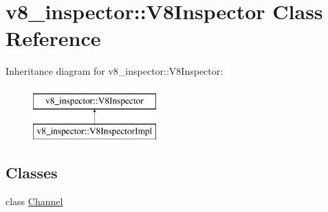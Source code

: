 \hypertarget{classv8__inspector_1_1V8Inspector}{}\section{v8\+\_\+inspector\+:\+:V8\+Inspector Class Reference}
\label{classv8__inspector_1_1V8Inspector}
Inheritance diagram for v8\+\_\+inspector\+:\+:V8\+Inspector\+:\begin{figure}[H]
\begin{center}
\leavevmode
\includegraphics[height=2.000000cm]{classv8__inspector_1_1V8Inspector}
\end{center}
\end{figure}
\subsection*{Classes}
\begin{DoxyCompactItemize}
\item 
class \mbox{\hyperlink{classv8__inspector_1_1V8Inspector_1_1Channel}{Channel}}
\end{DoxyCompactItemize}
